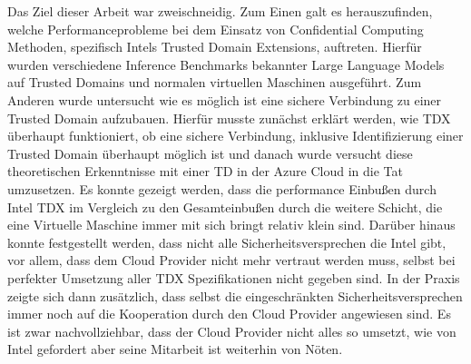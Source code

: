 
\Abstract
Das Ziel dieser Arbeit war zweischneidig. Zum Einen galt es herauszufinden, welche Performanceprobleme bei dem Einsatz von Confidential Computing Methoden, spezifisch Intels Trusted Domain Extensions, auftreten. Hierfür wurden verschiedene Inference Benchmarks bekannter Large Language Models auf Trusted Domains und normalen virtuellen Maschinen ausgeführt. Zum Anderen wurde untersucht wie es möglich ist eine sichere Verbindung zu einer Trusted Domain aufzubauen. Hierfür musste zunächst erklärt werden, wie TDX überhaupt funktioniert, ob eine sichere Verbindung, inklusive Identifizierung einer Trusted Domain überhaupt möglich ist und danach wurde versucht diese theoretischen Erkenntnisse mit einer TD in der Azure Cloud in die Tat umzusetzen. Es konnte gezeigt werden, dass die performance Einbußen durch Intel TDX im Vergleich zu den Gesamteinbußen durch die weitere Schicht, die eine Virtuelle Maschine immer mit sich bringt relativ klein sind. Darüber hinaus konnte festgestellt werden, dass nicht alle Sicherheitsversprechen die Intel gibt, vor allem, dass dem Cloud Provider nicht mehr vertraut werden muss, selbst bei perfekter Umsetzung aller TDX Spezifikationen nicht gegeben sind. In der Praxis zeigte sich dann zusätzlich, dass selbst die eingeschränkten Sicherheitsversprechen immer noch auf die Kooperation durch den Cloud Provider angewiesen sind. Es ist zwar nachvollziehbar, dass der Cloud Provider nicht alles so umsetzt, wie von Intel gefordert aber seine Mitarbeit ist weiterhin von Nöten.